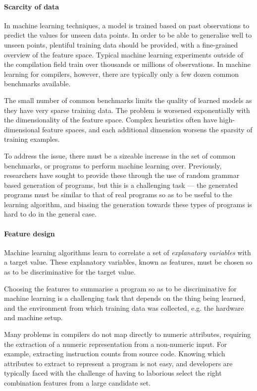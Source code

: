 \paragraph*{Scarcity of data} In machine learning techniques, a model is trained based on past observations to predict the values for unseen data points. In order to be able to generalise well to unseen points, plentiful training data should be provided, with a fine-grained overview of the feature space. Typical machine learning experiments outside of the compilation field train over thousands or millions of observations. In machine learning for compilers, however, there are typically only a few dozen common benchmarks available.

The small number of common benchmarks limits the quality of learned models as they have very sparse training data. The problem is worsened exponentially with the dimensionality of the feature space. Complex heuristics often have high-dimensional feature spaces, and each additional dimension worsens the sparsity of training examples.

To address the issue, there must be a sizeable increase in the set of common benchmarks, or programs to perform machine learning over. Previously, researchers have sought to provide these through the use of random grammar based generation of programs, but this is a challenging task --- the generated programs must be similar to that of real programs so as to be useful to the learning algorithm, and biasing the generation towards these types of programs is hard to do in the general case.

\paragraph*{Feature design} Machine learning algorithms learn to correlate a set of \emph{explanatory variables} with a target value. These explanatory variables, known as features, must be chosen so as to be discriminative for the target value.

Choosing the features to summarise a program so as to be discriminative for machine learning is a challenging task that depends on the thing being learned, and the environment from which training data was collected, e.g. the hardware and machine setup.

Many problems in compilers do not map directly to numeric attributes, requiring the extraction of a numeric representation from a non-numeric input. For example, extracting instruction counts from source code. Knowing which attributes to extract to represent a program is not easy, and developers are typically faced with the challenge of having to laborious select the right combination features from a large candidate set.

